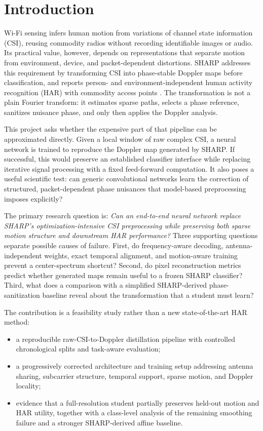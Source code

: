 \section{Introduction}
\label{sec:introduction}

Wi-Fi sensing infers human motion from variations of channel state information
(CSI), reusing commodity radios without recording identifiable images or audio.
Its practical value, however, depends on representations that separate motion
from environment, device, and packet-dependent distortions. SHARP addresses
this requirement by transforming CSI into phase-stable Doppler maps before
classification, and reports person- and environment-independent human activity
recognition (HAR) with commodity access points \cite{meneghello2023sharp}.
The transformation is not a plain Fourier transform: it estimates sparse paths,
selects a phase reference, sanitizes nuisance phase, and only then applies the
Doppler analysis.

This project asks whether the expensive part of that pipeline can be
approximated directly. Given a local window of raw complex CSI, a neural network
is trained to reproduce the Doppler map generated by SHARP. If successful, this
would preserve an established classifier interface while replacing iterative
signal processing with a fixed feed-forward computation. It also poses a useful
scientific test: can generic convolutional networks learn the correction of
structured, packet-dependent phase nuisances that model-based preprocessing
imposes explicitly?

The primary research question is:
\emph{Can an end-to-end neural network replace SHARP's optimization-intensive
CSI preprocessing while preserving both sparse motion structure and downstream
HAR performance?} Three supporting questions separate possible causes of
failure. First, do frequency-aware decoding, antenna-independent weights, exact
temporal alignment, and motion-aware training prevent a center-spectrum
shortcut? Second, do pixel reconstruction metrics predict whether generated
maps remain useful to a frozen SHARP classifier? Third, what does a comparison
with a simplified SHARP-derived phase-sanitization baseline reveal about the
transformation that a student must learn?

The contribution is a feasibility study rather than a new state-of-the-art HAR
method:
\begin{itemize}
    \item a reproducible raw-CSI-to-Doppler distillation pipeline with controlled
    chronological splits and task-aware evaluation;
    \item a progressively corrected architecture and training setup addressing
    antenna sharing, subcarrier structure, temporal support, sparse motion, and
    Doppler locality;
    \item evidence that a full-resolution student partially preserves held-out
    motion and HAR utility, together with a class-level analysis of the
    remaining smoothing failure and a stronger SHARP-derived affine baseline.
\end{itemize}

